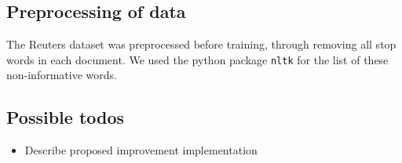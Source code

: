 \subsection{Preprocessing of data}
The Reuters dataset was preprocessed before training, through removing all stop words in each document. We used the python package \texttt{nltk} for the list of these non-informative words.


\subsection{Possible todos}
\begin{itemize}
	\item Describe proposed improvement implementation 
\end{itemize}

